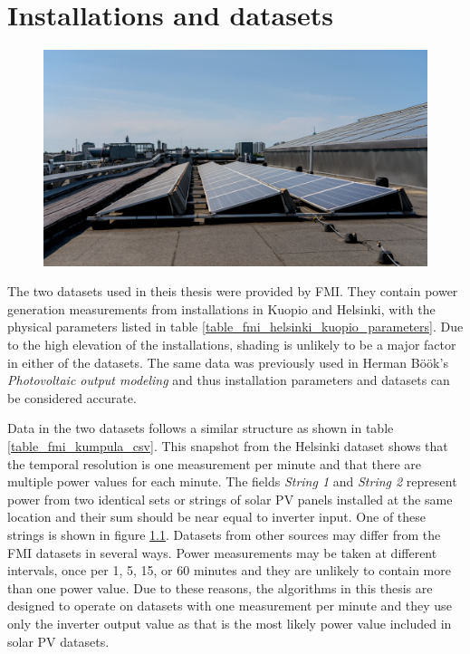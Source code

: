 \chapter{Installations and datasets}

\begin{figure}[h]
\centering
\includegraphics[width=0.8\linewidth]{pics/fmikumpula}
\label{fig_fmikumpula_panels}
\end{figure}


\noindent The two datasets used in theis thesis were provided by FMI. They contain power generation measurements from installations in Kuopio and Helsinki, with the physical parameters listed in table \ref{table_fmi_helsinki_kuopio_parameters}. Due to the high elevation of the installations, shading is unlikely to be a major factor in either of the datasets. The same data was previously used in Herman Böök's \textit{Photovoltaic output modeling}\cite{hbook1} and thus installation parameters and datasets can be considered accurate.

Data in the two datasets follows a similar structure as shown in table \ref{table_fmi_kumpula_csv}. This snapshot from the Helsinki dataset shows that the temporal resolution is one measurement per minute and that there are multiple power values for each minute. The fields \textit{String 1} and \textit{String 2} represent power from two identical sets or strings of solar PV panels installed at the same location and their sum should be near equal to inverter input. One of these strings is shown in figure \ref{fig_fmikumpula_panels}. Datasets from other sources may differ from the FMI datasets in several ways. Power measurements may be taken at different intervals, once per 1, 5, 15, or 60 minutes and they are unlikely to contain more than one power value. Due to these reasons, the algorithms in this thesis are designed to operate on datasets with one measurement per minute and they use only the inverter output value as that is the most likely power value included in solar PV datasets.


